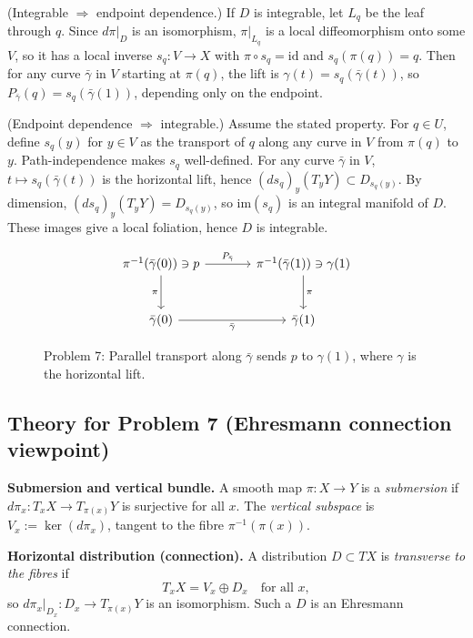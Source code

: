 \documentclass[12pt,a4paper]{article}
\theoremstyle{plain}
\theoremstyle{definition}      %
\begin{document}
(Integrable $\Rightarrow$ endpoint dependence.)
If $D$ is integrable, let $L_q$ be the leaf through $q$.
Since $d\pi|_{D}$ is an isomorphism, $\pi|_{L_q}$ is a local diffeomorphism onto some $V$, so it has a local
inverse $s_q:V\to X$ with $\pi\circ s_q=\mathrm{id}$ and $s_q(\pi(q))=q$.
Then for any curve $\bar\gamma$ in $V$ starting at $\pi(q)$, the lift is $\gamma(t)=s_q(\bar\gamma(t))$,
so $P_{\bar\gamma}(q)=s_q(\bar\gamma(1))$, depending only on the endpoint.

(Endpoint dependence $\Rightarrow$ integrable.)
Assume the stated property.
For $q\in U$, define $s_q(y)$ for $y\in V$ as the transport of $q$ along any curve in $V$ from $\pi(q)$ to $y$.
Path-independence makes $s_q$ well-defined.
For any curve $\bar\gamma$ in $V$, $t\mapsto s_q(\bar\gamma(t))$ is the horizontal lift, hence
$(ds_q)_y(T_yY)\subset D_{s_q(y)}$.
By dimension, $(ds_q)_y(T_yY)=D_{s_q(y)}$, so $\mathrm{im}(s_q)$ is an integral manifold of $D$.
These images give a local foliation, hence $D$ is integrable.



\begin{figure}[h]
	\centering
	\[
	\begin{tikzcd}[row sep=large, column sep=large]
		\pi^{-1}(\bar\gamma(0)) \ni p \arrow[r, "P_{\bar\gamma}"] \arrow[d, "\pi"'] &
		\pi^{-1}(\bar\gamma(1)) \ni \gamma(1) \arrow[d, "\pi"] \\
		\bar\gamma(0) \arrow[r, "\bar\gamma"'] & \bar\gamma(1)
	\end{tikzcd}
	\]
	\caption{Problem 7: Parallel transport along $\bar\gamma$ sends $p$ to $\gamma(1)$, where $\gamma$ is the horizontal lift.}
\end{figure}


\subsection*{Theory for Problem 7 (Ehresmann connection viewpoint)}

\textbf{Submersion and vertical bundle.}
A smooth map $\pi:X\to Y$ is a \emph{submersion} if $d\pi_x:T_xX\to T_{\pi(x)}Y$ is surjective for all $x$.
The \emph{vertical subspace} is $V_x:=\ker(d\pi_x)$, tangent to the fibre $\pi^{-1}(\pi(x))$.

\textbf{Horizontal distribution (connection).}
A distribution $D\subset TX$ is \emph{transverse to the fibres} if
\[
T_xX = V_x \oplus D_x \quad\text{for all }x,
\]
so $d\pi_x|_{D_x}:D_x\to T_{\pi(x)}Y$ is an isomorphism. Such a $D$ is an Ehresmann connection.
\end{document}
